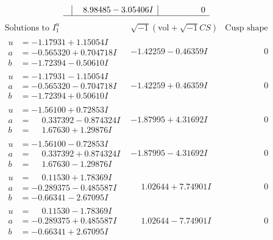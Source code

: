 \documentclass[1p]{elsarticle_modified}
\theoremstyle{definition}
\newcommand{\I}{\sqrt{-1}}
\begin{document}
$$\begin{array}{c|c|c}
 & \phantom{-}8.98485 - 3.05406 I & \phantom{-0.000000 } 0\\
 \hline 
 \end{array}$$\newpage$$\begin{array}{c|c|c}  
\text{Solutions to }I^u_{1}& \I (\text{vol} + \sqrt{-1}CS) & \text{Cusp shape}\\
 \hline 
\begin{aligned}
u &= -1.17931 + 1.15054 I \\
a &= -0.565320 + 0.704718 I \\
b &= -1.72394 - 0.50610 I\end{aligned}
 & -1.42259 - 0.46359 I & \phantom{-0.000000 } 0 \\ \hline\begin{aligned}
u &= -1.17931 - 1.15054 I \\
a &= -0.565320 - 0.704718 I \\
b &= -1.72394 + 0.50610 I\end{aligned}
 & -1.42259 + 0.46359 I & \phantom{-0.000000 } 0 \\ \hline\begin{aligned}
u &= -1.56100 + 0.72853 I \\
a &= \phantom{-}0.337392 - 0.874324 I \\
b &= \phantom{-}1.67630 + 1.29876 I\end{aligned}
 & -1.87995 + 4.31692 I & \phantom{-0.000000 } 0 \\ \hline\begin{aligned}
u &= -1.56100 - 0.72853 I \\
a &= \phantom{-}0.337392 + 0.874324 I \\
b &= \phantom{-}1.67630 - 1.29876 I\end{aligned}
 & -1.87995 - 4.31692 I & \phantom{-0.000000 } 0 \\ \hline\begin{aligned}
u &= \phantom{-}0.11530 + 1.78369 I \\
a &= -0.289375 - 0.485587 I \\
b &= -0.66341 - 2.67095 I\end{aligned}
 & \phantom{-}1.02644 + 7.74901 I & \phantom{-0.000000 } 0 \\ \hline\begin{aligned}
u &= \phantom{-}0.11530 - 1.78369 I \\
a &= -0.289375 + 0.485587 I \\
b &= -0.66341 + 2.67095 I\end{aligned}
 & \phantom{-}1.02644 - 7.74901 I & \phantom{-0.000000 } 0 \\ \hline\begin{aligned}

\end{aligned}
\end{array}$$
\end{document}
